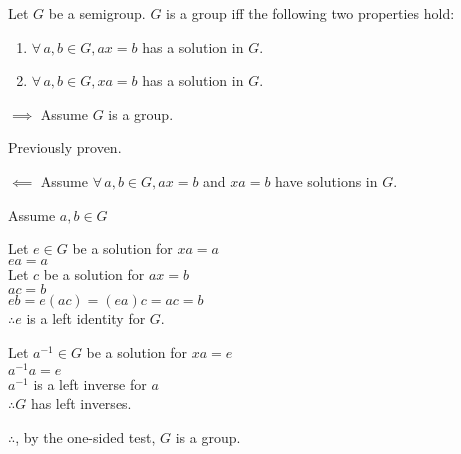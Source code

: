 \documentclass[letterpaper,12pt,fleqn]{article}
\begin{document}
\begin{theorem}
  Let $G$ be a semigroup. $G$ is a group iff the following two properties hold:
  \begin{enumerate}
    \item $\forall\,a,b\in G,ax=b$ has a solution in $G$.
    \item $\forall\,a,b\in G,xa=b$ has a solution in $G$.
  \end{enumerate}
\end{theorem}

\begin{theproof}
  \listbreak
  \begin{description}
  \item $\implies$ Assume $G$ is a group.

    Previously proven.

  \item $\impliedby$ Assume $\forall\,a,b\in G,ax=b$ and $xa=b$ have solutions
    in $G$.

    Assume $a,b\in G$
    
    Let $e\in G$ be a solution for $xa=a$ \\
    $ea=a$ \\
    Let $c$ be a solution for $ax=b$ \\
    $ac=b$ \\
    $eb=e(ac)=(ea)c=ac=b$ \\
    $\therefore e$ is a left identity for $G$.

    Let $a^{-1}\in G$ be a solution for $xa=e$ \\
    $a^{-1}a=e$ \\
    $a^{-1}$ is a left inverse for $a$ \\
    $\therefore G$ has left inverses.

    $\therefore$, by the one-sided test, $G$ is a group.
  \end{description}
\end{theproof}
\end{document}
